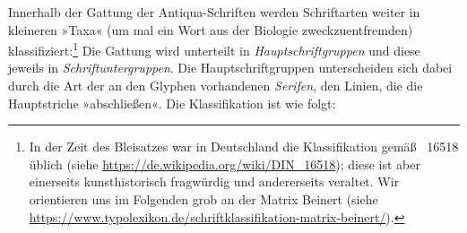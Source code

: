 
Innerhalb der Gattung der Antiqua-Schriften werden Schriftarten weiter
in kleineren »Taxa« (um mal ein Wort aus der Biologie
zweckzuentfremden) klassifiziert:\footnote{In der Zeit des Bleisatzes
  war in Deutschland die Klassifikation gemäß ~16518 üblich
  (siehe \url{https://de.wikipedia.org/wiki/DIN_16518}); diese ist
  aber einerseits kunsthistorisch fragwürdig und andererseits
  veraltet.  Wir orientieren uns im Folgenden grob an der Matrix
  Beinert (siehe
  \url{https://www.typolexikon.de/schriftklassifikation-matrix-beinert/}).}
Die Gattung wird unterteilt in \emph{Hauptschriftgruppen} und diese
jeweils in \emph{Schriftuntergruppen}.  Die Hauptschriftgruppen
unterscheiden sich dabei durch die Art der an den Glyphen vorhandenen
\emph{Serifen}, den Linien, die die Hauptstriche »abschließen«.  Die
Klassifikation ist wie folgt:
